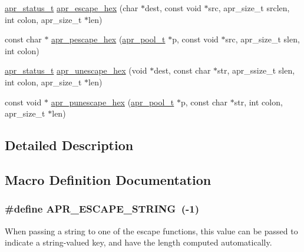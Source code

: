 \begin{DoxyCompactItemize}
\item 
\hyperlink{group__apr__errno_gaf76ee4543247e9fb3f3546203e590a6c}{apr\-\_\-status\-\_\-t} \hyperlink{group___a_p_r___util___escaping_gac87b3c2f42fb60f6ea4d8321e60ce69e}{apr\-\_\-escape\-\_\-hex} (char $\ast$dest, const void $\ast$src, apr\-\_\-size\-\_\-t srclen, int colon, apr\-\_\-size\-\_\-t $\ast$len)
\item 
const char $\ast$ \hyperlink{group___a_p_r___util___escaping_ga2a12cd35230cc148da52ea983da4b211}{apr\-\_\-pescape\-\_\-hex} (\hyperlink{group__apr__pools_gaf137f28edcf9a086cd6bc36c20d7cdfb}{apr\-\_\-pool\-\_\-t} $\ast$p, const void $\ast$src, apr\-\_\-size\-\_\-t slen, int colon)
\item 
\hyperlink{group__apr__errno_gaf76ee4543247e9fb3f3546203e590a6c}{apr\-\_\-status\-\_\-t} \hyperlink{group___a_p_r___util___escaping_ga98c3558219d7ce3dd29420c0124ddd73}{apr\-\_\-unescape\-\_\-hex} (void $\ast$dest, const char $\ast$str, apr\-\_\-ssize\-\_\-t slen, int colon, apr\-\_\-size\-\_\-t $\ast$len)
\item 
const void $\ast$ \hyperlink{group___a_p_r___util___escaping_ga8cba37bcacb5e1c9440f2b35d44afc49}{apr\-\_\-punescape\-\_\-hex} (\hyperlink{group__apr__pools_gaf137f28edcf9a086cd6bc36c20d7cdfb}{apr\-\_\-pool\-\_\-t} $\ast$p, const char $\ast$str, int colon, apr\-\_\-size\-\_\-t $\ast$len)
\end{DoxyCompactItemize}


\subsection{Detailed Description}


\subsection{Macro Definition Documentation}
\hypertarget{group___a_p_r___util___escaping_ga793ae1b187ce490c65eeee2eb59d2831}{
\subsubsection[{A\-P\-R\-\_\-\-E\-S\-C\-A\-P\-E\-\_\-\-S\-T\-R\-I\-N\-G}]{\setlength{\rightskip}{0pt plus 5cm}\#define A\-P\-R\-\_\-\-E\-S\-C\-A\-P\-E\-\_\-\-S\-T\-R\-I\-N\-G~(-\/1)}}\label{group___a_p_r___util___escaping_ga793ae1b187ce490c65eeee2eb59d2831}
When passing a string to one of the escape functions, this value can be passed to indicate a string-\/valued key, and have the length computed automatically. 

